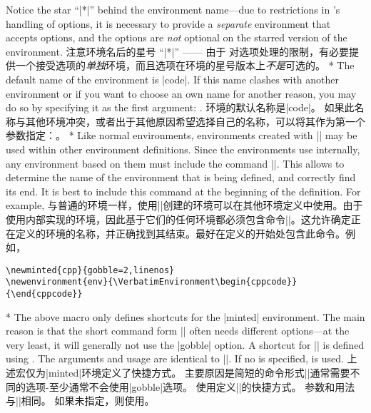 \begin{paracol}{2}
Notice the star ``|*|'' behind the environment name---due to restrictions in 's handling
of options, it is necessary to provide a \emph{separate} environment that accepts options, and the options
are \emph{not} optional on the starred version of the environment.
\switchcolumn
注意环境名后的星号 ``|*|'' —— 由于  对选项处理的限制，有必要提供一个接受选项的\emph{单独}环境，而且选项在环境的星号版本上\emph{不是}可选的。
\switchcolumn[0]*%
The default name of the environment is |code|.
If this name clashes with another environment or if you want to choose an own name for another reason, you may
do so by specifying it as the first argument: \cmd\newminted{}.
\switchcolumn
环境的默认名称是|code|。
如果此名称与其他环境冲突，或者出于其他原因希望选择自己的名称，可以将其作为第一个参数指定：\cmd\newminted{}。
\switchcolumn[0]*%
Like normal  environments, environments created with |\newminted| may be used within other environment definitions.  Since the  environments use  internally, any environment based on them must include the  command |\VerbatimEnvironment|.  This allows  to determine the name of the environment that is being defined, and correctly find its end.  It is best to include this command at the beginning of the definition.  For example,
\switchcolumn
与普通的环境一样，使用|\newminted|创建的环境可以在其他环境定义中使用。由于使用内部实现的环境，因此基于它们的任何环境都必须包含命令|\VerbatimEnvironment|。这允许确定正在定义的环境的名称，并正确找到其结束。最好在定义的开始处包含此命令。例如，
\end{paracol}


\begin{Verbatim}
\newminted{cpp}{gobble=2,linenos}
\newenvironment{env}{\VerbatimEnvironment\begin{cppcode}}{\end{cppcode}}
\end{Verbatim}

\begin{paracol}{2}
\switchcolumn[0]*%
\DescribeMacro{\newmint}
The above macro only defines shortcuts for the |minted| environment.
The main reason is that the short command form |\mint| often needs different options---at the very least, it
will generally not use the |gobble| option.
A shortcut for |\mint| is defined using \cmd\newmint{}.
The arguments and usage are identical to |\newminted|.
If no  is specified,  is used.
\switchcolumn
\DescribeMacro{\newmint}
上述宏仅为|minted|环境定义了快捷方式。
主要原因是简短的命令形式|\mint|通常需要不同的选项-至少通常不会使用|gobble|选项。
使用\cmd\newmint{}定义|\mint|的快捷方式。
参数和用法与|\newminted|相同。
如果未指定，则使用。
\end{paracol}



